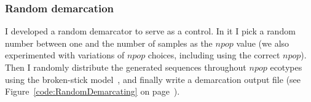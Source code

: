 \subsubsection*{Random demarcation}
I developed a random demarcator to serve as a control.
In it I pick a random number between one and the number of samples as the $npop$ value (we also experimented with variations of $npop$ choices, including using the correct $npop$). 
Then I randomly distribute the generated sequences throughout $npop$ ecotypes using the broken-stick model~\cite{tokeshi1990niche}, and finally write a demarcation output file (see Figure~\ref{code:RandomDemarcating} on page~\pageref{code:RandomDemarcating}).


